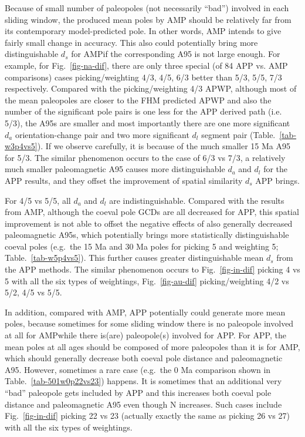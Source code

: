 Because of small number of paleopoles (not necessarily ``bad'') involved in
each sliding window, the produced mean poles by AMP should be relatively far
from its contemporary model-predicted pole. In other words, AMP intends to give
fairly small change in accuracy. This also could potentially bring more
distinguishable $d_s$ for AMP\@ if the corresponding A95 is not large enough.
For example, for Fig.~\ref{fig-na-dif}, there are only three special (of 84 APP
vs. AMP comparisons) cases picking/weighting 4/3, 4/5, 6/3 better than 5/3, 5/5,
7/3 respectively. Compared with the picking/weighting 4/3 APWP, although most of
the mean paleopoles are closer to the FHM predicted APWP and also the number of
the significant pole pairs is one less for the APP derived path (i.e. 5/3), the
A95s are smaller and most importantly there are one more significant $d_a$
orientation-change pair and two more significant $d_l$ segment pair
(Table.~\ref{tab-w3p4vs5}). If we observe carefully, it is because of the much
smaller 15 Ma A95 for 5/3. The similar phenomenon occurs to the case of 6/3 vs
7/3, a relatively much smaller paleomagnetic A95 causes more distinguishable
$d_a$ and $d_l$ for the APP results, and they offset the improvement of spatial
similarity $d_s$ APP brings.

For 4/5 vs 5/5, all $d_a$ and $d_l$ are indistinguishable. Compared with the
results from AMP, although the coeval pole GCDs are all decreased for APP, this
spatial improvement is not able to offset the negative effects of also
generally decreased paleomagnetic A95s, which potentially brings more
statistically distinguishable coeval poles (e.g.\ the 15 Ma and 30 Ma poles for
picking 5 and weighting 5; Table.~\ref{tab-w5p4vs5}). This further causes
greater distinguishable mean $d_s$ from the APP methods. The similar phenomenon
occurs to Fig.~\ref{fig-in-dif} picking 4 vs 5 with all the six types of
weightings, Fig.~\ref{fig-au-dif} picking/weighting 4/2 vs
5/2, 4/5 vs 5/5.

In addition, compared with AMP, APP potentially could generate more mean poles,
because sometimes for some sliding window there is no paleopole involved at all
for AMP\@ while there is(are) paleopole(s) involved for APP\@. For APP, the
mean poles at all ages should be composed of more paleopoles than it is for
AMP, which should generally decrease both coeval pole distance and paleomagnetic
A95. However, sometimes a rare case (e.g.\ the 0 Ma comparison shown in
Table.~\ref{tab-501w0p22vs23}) happens. It is sometimes that an additional
very ``bad'' paleopole gets included by APP and this increases both coeval pole
distance and paleomagnetic A95 even though N increases. Such cases include
Fig.~\ref{fig-in-dif} picking 22 vs 23 (actually exactly the same as picking 26
vs 27) with all the six types of weightings.

